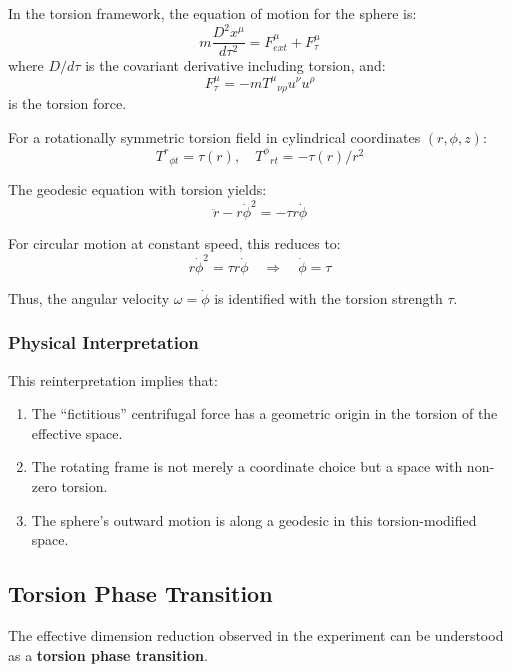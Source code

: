 \documentclass[12pt,a4paper]{article}
\begin{document}
In the torsion framework, the equation of motion for the sphere is:
\begin{equation}
    m\frac{D^2 x^\mu}{d\tau^2} = F^\mu_{ext} + F^\mu_\tau
\end{equation}
where $D/d\tau$ is the covariant derivative including torsion, and:
\begin{equation}
    F^\mu_\tau = -mT^\mu{}_{\nu\rho}u^\nu u^\rho
\end{equation}
is the torsion force.

For a rotationally symmetric torsion field in cylindrical coordinates $(r, \phi, z)$:
\begin{equation}
    T^r{}_{\phi t} = \tau(r), \quad T^\phi{}_{rt} = -\tau(r)/r^2
\end{equation}

The geodesic equation with torsion yields:
\begin{equation}
    \ddot{r} - r\dot{\phi}^2 = -\tau r \dot{\phi}
\end{equation}

For circular motion at constant speed, this reduces to:
\begin{equation}
    r\dot{\phi}^2 = \tau r \dot{\phi} \quad \Rightarrow \quad \dot{\phi} = \tau
\end{equation}

Thus, the angular velocity $\omega = \dot{\phi}$ is identified with the torsion strength $\tau$.

\subsubsection{Physical Interpretation}

This reinterpretation implies that:
\begin{enumerate}
    \item The ``fictitious'' centrifugal force has a geometric origin in the torsion of the effective space.
    \item The rotating frame is not merely a coordinate choice but a space with non-zero torsion.
    \item The sphere's outward motion is along a geodesic in this torsion-modified space.
\end{enumerate}

\subsection{Torsion Phase Transition}

The effective dimension reduction observed in the experiment can be understood as a \textbf{torsion phase transition}.
\end{document}
